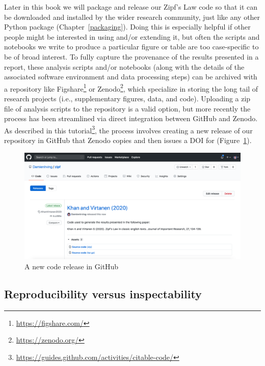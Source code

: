 \documentclass[
]{krantz}
\renewcommand{\href}[2]{#2\footnote{\url{#1}}}
\begin{document}
Later in this book we will package and release our Zipf's Law code
so that it can be downloaded and installed by the wider research community,
just like any other Python package (Chapter~\ref{packaging}).
Doing this is especially helpful if other people might be interested in using and/or extending it,
but often the scripts and notebooks we write to produce a particular figure or table
are too case-specific to be of broad interest.
To fully capture the provenance of the results presented in a report,
these analysis scripts and/or notebooks
(along with the details of the associated software environment and data processing steps)
can be archived with a repository like \href{https://figshare.com/}{Figshare} or \href{https://zenodo.org/}{Zenodo},
which specialize in storing the long tail of research projects
(i.e., supplementary figures, data, and code).
Uploading a zip file of analysis scripts to the repository is a valid option,
but more recently the process has been streamlined via direct integration
between GitHub and Zenodo.
As described in \href{https://guides.github.com/activities/citable-code/}{this tutorial},
the process involves creating a new release of our repository in GitHub
that Zenodo copies and then issues a DOI for (Figure~\ref{fig:provenance-release}).

\begin{figure}

{\centering \includegraphics[width=1\linewidth]{figures/provenance/release} 

}

\caption{A new code release in GitHub}\label{fig:provenance-release}
\end{figure}

\hypertarget{provenance-inspectability}{%
\subsection{Reproducibility versus inspectability}\label{provenance-inspectability}}
\end{document}
